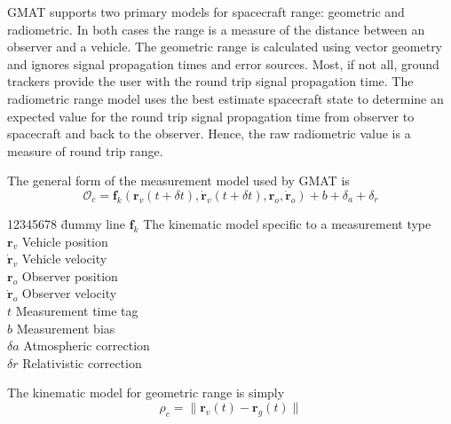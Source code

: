 GMAT supports two primary models for spacecraft range: geometric and
radiometric. In both cases the range is a measure of the distance
between an observer and a vehicle.
 The geometric range is calculated using vector geometry and ignores signal propagation
  times and error sources.  Most, if not all, ground trackers provide the user with
  the round trip signal propagation time.  The radiometric range model uses the best
   estimate spacecraft state to determine an expected value for the round trip signal
   propagation time from observer to spacecraft and back to the observer.  Hence,
   the raw radiometric value is a measure of round trip range.

The general form of the measurement model used by GMAT is
%
\begin{equation}
   \mathcal{O}_c = \mathbf{f}_k\left(\mathbf{r}_v(t + \delta t), \dot{\mathbf{r}}_v(t + \delta t),
   \mathbf{r}_o, \dot{\mathbf{r}}_o\right) + b + \delta_a + \delta_r
\end{equation}
%
%
\begin{tabbing}[htbp!]
12345678 \= dummy line \kill
$\mathbf{f}_k$ \> The kinematic model specific to a measurement type\\
$\mathbf{r}_v$ \> Vehicle position\\
$\dot{\mathbf{r}}_v$ \> Vehicle velocity\\
$\mathbf{r}_o$ \> Observer position\\
$\dot{\mathbf{r}}_o$    \> Observer velocity\\
$t$    \> Measurement time tag\\
$b$    \> Measurement bias\\
$\delta a$    \> Atmospheric correction\\
$\delta r$     \> Relativistic correction\\
\end{tabbing}

The kinematic model for geometric range is simply
%
\begin{equation}
    \rho_c = \| \mathbf{r}_v(t) - \mathbf{r}_g(t)\|
\end{equation}
%

